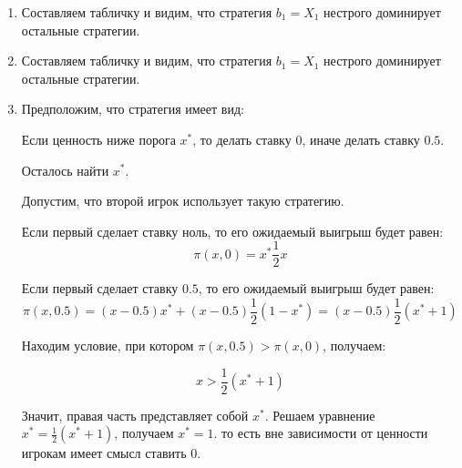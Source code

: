 \begin{enumerate}
\item Составляем табличку и видим, что стратегия $ b_{1}=X_{1} $ нестрого доминирует остальные стратегии.


\item  Составляем табличку и видим, что стратегия $ b_{1}=X_{1} $ нестрого доминирует остальные стратегии.

\item Предположим, что стратегия имеет вид:

Если ценность ниже порога $ x^{*} $, то делать ставку 0, иначе делать ставку $ 0.5 $.

Осталось найти $ x^{*} $.

Допустим, что второй игрок использует такую стратегию.

Если первый сделает ставку ноль, то его ожидаемый выигрыш будет равен:
\begin{equation}
\pi(x,0)=x^{*}\frac{1}{2}x
\end{equation}

Если первый сделает ставку $0.5$, то его ожидаемый выигрыш будет равен:
\begin{equation}
\pi(x,0.5)=(x-0.5)x^{*}+(x-0.5)\frac{1}{2}(1-x^{*})=(x-0.5)\frac{1}{2}(x^{*}+1)
\end{equation}

Находим условие, при котором $ \pi(x,0.5)>\pi(x,0) $, получаем:

\begin{equation}
x>\frac{1}{2}(x^{*}+1)
\end{equation}

Значит, правая часть представляет собой $ x^{*} $. Решаем уравнение $x^{*}=\frac{1}{2}(x^{*}+1)  $, получаем $ x^{*}=1 $. то есть вне зависимости от ценности игрокам имеет смысл ставить 0.


\end{enumerate}
